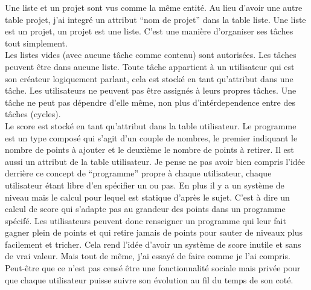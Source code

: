 \documentclass[12pt]{article}
\begin{document}
Une liste et un projet sont vus comme la même entité. Au lieu d'avoir une autre
table projet, j'ai integré un attribut ``nom de projet'' dans la table liste.
Une liste est un projet, un projet est une liste. C'est une manière d'organiser
ses tâches tout simplement. \\

Les listes vides (avec aucune tâche comme contenu) sont autorisées. Les tâches
peuvent être dans aucune liste. Toute tâche appartient à un utilisateur qui est
son créateur logiquement parlant, cela est stocké en tant qu'attribut dans une
tâche. Les utilisateurs ne peuvent pas être assignés à leurs propres tâches.
Une tâche ne peut pas dépendre d'elle même, non plus d'intérdependence entre
des tâches (cycles). \\

Le score est stocké en tant qu'attribut dans la table utilisateur. Le programme
est un type composé qui s'agit d'un couple de nombres, le premier indiquant le
nombre de points à ajouter et le deuxième le nombre de points à retirer. Il est
aussi un attribut de la table utilisateur. Je pense ne pas avoir bien compris
l'idée derrière ce concept de ``programme'' propre à chaque utilisateur, chaque
utilisateur étant libre d'en spécifier un ou pas. En plus il y a un système de
niveau mais le calcul pour lequel est statique d'après le sujet. C'est à dire
un calcul de score qui s'adapte pas au grandeur des points dans un programme
spécifé. Les utilisateurs peuvent donc renseigner un programme qui leur fait
gagner plein de points et qui retire jamais de points pour sauter de niveaux
plus facilement et tricher. Cela rend l'idée d'avoir un système de score
inutile et sans de vrai valeur. Mais tout de même, j'ai essayé de faire comme
je l'ai compris. Peut-être que ce n'est pas censé être une fonctionnalité
sociale mais privée pour que chaque utilisateur puisse suivre son évolution au
fil du temps de son coté.


\end{document}
